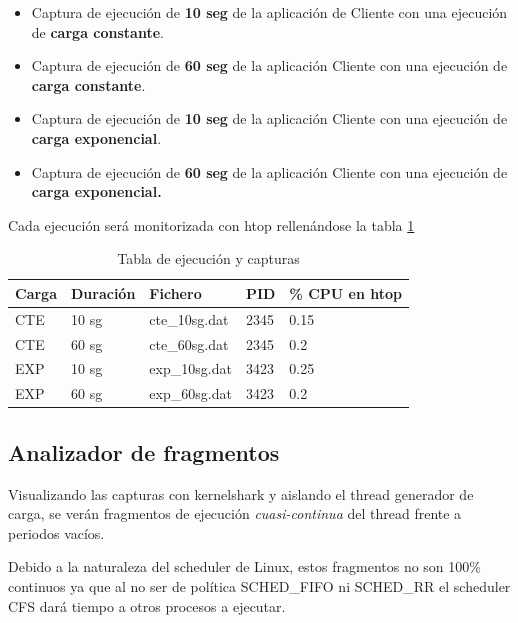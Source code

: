 \documentclass[a4paper,11pt,spanish,twoside]{article}
\begin{document}
\begin{itemize}
\item Captura de ejecución de \textbf{10 seg} de la aplicación de
  Cliente con una ejecución de \textbf{carga constante}.

\item Captura de ejecución de \textbf{60 seg} de la aplicación Cliente
  con una ejecución de \textbf{carga constante}.

\item Captura de ejecución de \textbf{10 seg} de la aplicación Cliente
  con una ejecución de \textbf{carga exponencial}.

\item Captura de ejecución de \textbf{60 seg} de la aplicación Cliente
  con una ejecución de \textbf{carga exponencial.}
\end{itemize}

Cada ejecución será monitorizada con htop rellenándose la tabla \ref{tab:capturas}

\begin{table}[h!]
  \centering
  \begin{tabular}{p{1in}|p{1in}|p{1in}|p{1in}|p{1in}}
    \textbf{Carga} & \textbf{Duración} & \textbf{Fichero} &
    \textbf{PID} & \textbf{\% CPU en htop} \\ \hline
CTE & 10 sg & cte\_10sg.dat & 2345 & 0.15 \\
CTE & 60 sg & cte\_60sg.dat & 2345 & 0.2 \\
EXP & 10 sg & exp\_10sg.dat & 3423 & 0.25 \\
EXP & 60 sg & exp\_60sg.dat & 3423 & 0.2 \\


\end{tabular}
  \caption{Tabla de ejecución y capturas}
  \label{tab:capturas}
\end{table}

\subsection{Analizador de fragmentos}
\label{sec:anafragmentos}

Visualizando las capturas con kernelshark y aislando el thread generador
de carga, se verán fragmentos de ejecución \emph{cuasi-continua} del
thread frente a periodos vacíos.

Debido a la naturaleza del scheduler de Linux, estos fragmentos no son
100\% continuos ya que al no ser de política SCHED\_FIFO ni SCHED\_RR
el scheduler CFS dará tiempo a otros procesos a ejecutar.
\end{document}
